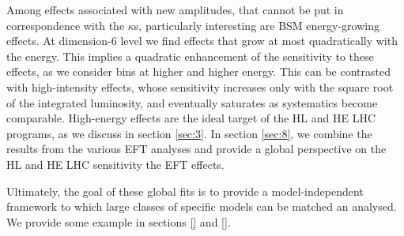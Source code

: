 Among effects associated with new amplitudes, that cannot be put in correspondence with the $\kappa$s, particularly interesting are BSM energy-growing effects. At dimension-6 level we find effects that grow at most quadratically with the energy. This implies a quadratic enhancement of the sensitivity to these effects, as we consider bins at higher and higher energy. 
 This can be contrasted with high-intensity effects, whose sensitivity increases only with the square root of the integrated luminosity, and eventually saturates as systematics become comparable. High-energy effects are the ideal target of the HL and HE LHC programs, as we discuss in section \ref{sec:3}.
 In section \ref{sec:8}, we combine the results from the various EFT analyses and provide a global perspective on the HL and HE LHC sensitivity the EFT effects. 

Ultimately, the goal of these global fits is to provide a model-independent framework to which large classes of specific models can be matched an analysed. We provide some example in sections \ref{} and \ref{}.


